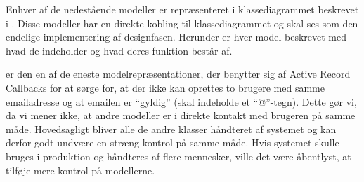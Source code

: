 Enhver af de nedestående modeller er repræsenteret i klassediagrammet beskrevet i . Disse modeller har en direkte kobling til klassediagrammet og skal ses som den endelige implementering af designfasen. Herunder er hver model beskrevet med hvad de indeholder og hvad deres funktion består af.

 er den en af de eneste modelrepræsentationer, der benytter sig af Active Record Callbacks for at sørge for, at der \fx ikke kan oprettes to brugere med samme emailadresse og at emailen er ``gyldig'' (skal indeholde et ``@''-tegn). Dette gør vi, da vi mener ikke, at andre modeller er i direkte kontakt med brugeren på samme måde. Hovedsagligt bliver alle de andre klasser håndteret af systemet og kan derfor godt undvære en stræng kontrol på samme måde. Hvis systemet skulle bruges i produktion og håndteres af flere mennesker, ville det være åbentlyst, at tilføje mere kontrol på modellerne.

